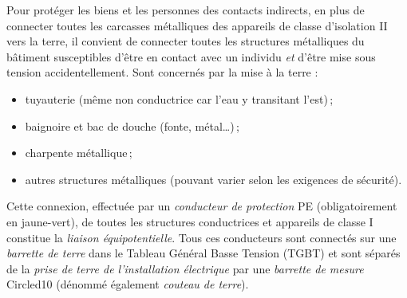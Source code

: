 Pour protéger les biens et les personnes des contacts indirects, en plus de connecter toutes les carcasses métalliques des appareils de classe d'isolation II vers la terre, il convient de connecter toutes les structures métalliques du bâtiment susceptibles d'être en contact avec un individu \emph{et} d'être mise sous tension accidentellement. Sont concernés par la mise à la terre  :
\begin{itemize}
\item tuyauterie (même non conductrice car l'eau y transitant l'est)\,;
\item baignoire et bac de douche (fonte, métal\ldots)\,;
\item charpente métallique\,;
\item autres structures métalliques (pouvant varier selon les exigences de sécurité).
\end{itemize}
Cette connexion, effectuée par un \emph{conducteur de protection} PE  (obligatoirement en jaune-vert), de toutes les structures conductrices et appareils de classe I constitue la \emph{liaison équipotentielle}. Tous ces conducteurs sont connectés sur une \emph{barrette de terre}  dans le Tableau Général Basse Tension (TGBT) et sont séparés de la \emph{prise de terre de l'installation électrique}  par une \emph{barrette de mesure} \\Circled{10} (dénommé également \emph{couteau de terre}).\\

